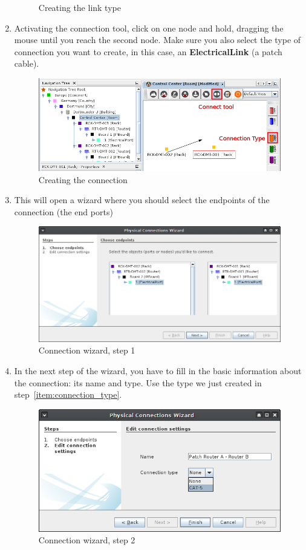 \documentclass[a4paper]{article}
\begin{document}
\begin{enumerate}
\begin{figure}[h!]
					\caption{Creating the link type}
					\label{fig:l1_example_1_electrical_link_type}
				\end{figure}
				\item Activating the connection tool, click on one node and hold, dragging the mouse until you reach the second node. Make sure you also select the type of connection you want to create, in this case, an \textbf{ElectricalLink} (a patch cable).
				\begin{figure}[h!]
					\centering
					\includegraphics[width=0.8\linewidth]{img/l1_example_1_new_connection.png}
					\caption{Creating the connection}
					\label{fig:l1_example_1_new_connection}
				\end{figure}
				\item This will open a wizard where you should select the endpoints of the connection (the end ports)
				\begin{figure}[h!]
					\centering
					\includegraphics[width=0.8\linewidth]{img/l1_example_1_endpoints.png}
					\caption{Connection wizard, step 1}
					\label{fig:l1_example_1_endpoints}
				\end{figure}
				\item In the next step of the wizard, you have to fill in the basic information about the connection: its name and type. Use the type we just created in step~\ref{item:connection_type}.
				\begin{figure}[h!]
					\centering
					\includegraphics[width=0.5\linewidth]{img/l1_example_1_basic_info.png}
					\caption{Connection wizard, step 2}
					\label{fig:l1_example_1_basic_info}
				\end{figure}
			\end{enumerate}
			
\end{document}
